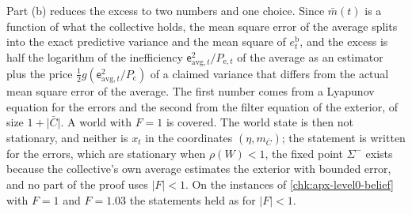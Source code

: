 Part (b) reduces the excess to two numbers and one choice. Since $\bar m(t)$ is a function of what the collective holds, the mean square error of the average splits into the exact predictive variance and the mean square of $e^{\mathrm b}_t$, and the excess is half the logarithm of the inefficiency $\mathsf e_{\mathrm{avg},t}^2/P_{\mathrm e,t}$ of the average as an estimator plus the price $\frac12g(\mathsf e_{\mathrm{avg},t}^2/P_{\mathrm c})$ of a claimed variance that differs from the actual mean square error of the average. The first number comes from a Lyapunov equation for the errors and the second from the filter equation of the exterior, of size $1+\lvert\bar C\rvert$. A world with $F=1$ is covered. The world state is then not stationary, and neither is $x_t$ in the coordinates $(\eta,m_{\bar C})$; the statement is written for the errors, which are stationary when $\rho(W)<1$, the fixed point $\Sigma^-$ exists because the collective's own average estimates the exterior with bounded error, and no part of the proof uses $\lvert F\rvert<1$. On the instances of \cref{chk:apx-level0-belief} with $F=1$ and $F=1.03$ the statements held as for $\lvert F\rvert<1$.

